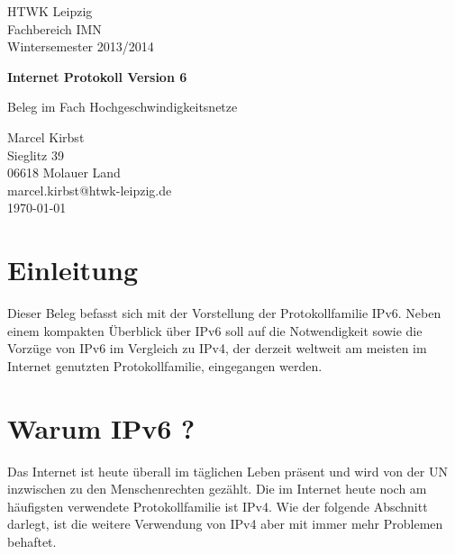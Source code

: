 \documentclass[a4paper,12pt]{scrartcl}
\begin{document}
 
\begin{titlepage}
\begin{small}
\vfill {HTWK Leipzig\\
Fachbereich IMN \\
Wintersemester 2013/2014}
\end{small}
 
\begin{center}
\begin{Large}
\vfill {\textsf{\textbf{
Internet Protokoll Version 6\\
}}}
\end{Large}
Beleg im Fach Hochgeschwindigkeitsnetze
\end{center}
 
\begin{small}
\vfill Marcel Kirbst \\ Sieglitz 39 \\ 06618 Molauer Land \\
marcel.kirbst@htwk-leipzig.de\\
\today
\end{small}
 
\end{titlepage}
 
\tableofcontents
\thispagestyle{empty}
 
\clearpage
 
\onehalfspacing
 
\pagestyle{plain}
 
\section{Einleitung}
Dieser Beleg befasst sich mit der Vorstellung der Protokollfamilie IPv6. Neben einem kompakten Überblick über IPv6 soll auf die Notwendigkeit sowie die Vorzüge von IPv6 im Vergleich zu IPv4, der derzeit weltweit am meisten im Internet genutzten Protokollfamilie,  eingegangen werden.
 
\section{Warum IPv6 ?}
Das Internet ist heute überall im täglichen Leben präsent und wird von der UN inzwischen zu den Menschenrechten gezählt.\cite{uninet} Die im Internet heute noch am häufigsten verwendete Protokollfamilie ist IPv4. Wie der folgende Abschnitt darlegt, ist die weitere Verwendung von IPv4 aber mit immer mehr Problemen behaftet.
\end{document}

